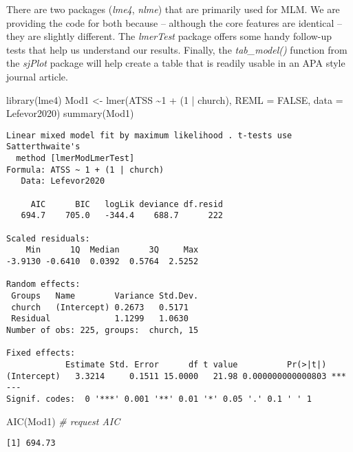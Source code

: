 \documentclass[
  11pt,
]{book}
\newenvironment{Shaded}{\begin{snugshade}}{\end{snugshade}}
\newcommand{\AttributeTok}[1]{\textcolor[rgb]{0.77,0.63,0.00}{#1}}
\newcommand{\CommentTok}[1]{\textcolor[rgb]{0.56,0.35,0.01}{\textit{#1}}}
\newcommand{\ConstantTok}[1]{\textcolor[rgb]{0.00,0.00,0.00}{#1}}
\newcommand{\DecValTok}[1]{\textcolor[rgb]{0.00,0.00,0.81}{#1}}
\newcommand{\FunctionTok}[1]{\textcolor[rgb]{0.00,0.00,0.00}{#1}}
\newcommand{\NormalTok}[1]{#1}
\newcommand{\OtherTok}[1]{\textcolor[rgb]{0.56,0.35,0.01}{#1}}
\newcommand{\SpecialCharTok}[1]{\textcolor[rgb]{0.00,0.00,0.00}{#1}}
\begin{document}
There are two packages (\emph{lme4}, \emph{nlme}) that are primarily used for MLM. We are providing the code for both because -- although the core features are identical -- they are slightly different. The \emph{lmerTest} package offers some handy follow-up tests that help us understand our results. Finally, the \emph{tab\_model()} function from the \emph{sjPlot} package will help create a table that is readily usable in an APA style journal article.

\begin{Shaded}
\begin{Highlighting}[]
\FunctionTok{library}\NormalTok{(lme4)}
\NormalTok{Mod1 }\OtherTok{\textless{}{-}} \FunctionTok{lmer}\NormalTok{(ATSS }\SpecialCharTok{\textasciitilde{}}\DecValTok{1} \SpecialCharTok{+}\NormalTok{ (}\DecValTok{1} \SpecialCharTok{|}\NormalTok{ church), }\AttributeTok{REML =} \ConstantTok{FALSE}\NormalTok{, }\AttributeTok{data =}\NormalTok{ Lefevor2020)}
\FunctionTok{summary}\NormalTok{(Mod1)}
\end{Highlighting}
\end{Shaded}

\begin{verbatim}
Linear mixed model fit by maximum likelihood . t-tests use Satterthwaite's
  method [lmerModLmerTest]
Formula: ATSS ~ 1 + (1 | church)
   Data: Lefevor2020

     AIC      BIC   logLik deviance df.resid 
   694.7    705.0   -344.4    688.7      222 

Scaled residuals: 
    Min      1Q  Median      3Q     Max 
-3.9130 -0.6410  0.0392  0.5764  2.5252 

Random effects:
 Groups   Name        Variance Std.Dev.
 church   (Intercept) 0.2673   0.5171  
 Residual             1.1299   1.0630  
Number of obs: 225, groups:  church, 15

Fixed effects:
            Estimate Std. Error      df t value          Pr(>|t|)    
(Intercept)   3.3214     0.1511 15.0000   21.98 0.000000000000803 ***
---
Signif. codes:  0 '***' 0.001 '**' 0.01 '*' 0.05 '.' 0.1 ' ' 1
\end{verbatim}

\begin{Shaded}
\begin{Highlighting}[]
\FunctionTok{AIC}\NormalTok{(Mod1) }\CommentTok{\# request AIC}
\end{Highlighting}
\end{Shaded}

\begin{verbatim}
[1] 694.73
\end{verbatim}
\end{document}
